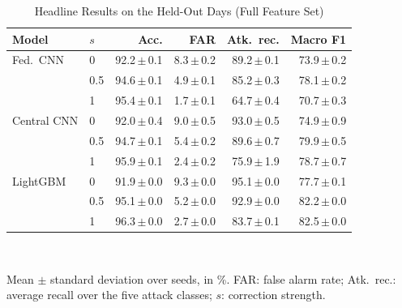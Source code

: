 \begin{table}[t]
\centering
\scriptsize
\caption{Headline Results on the Held-Out Days (Full Feature Set)}
\label{tab:headline}
\setlength{\tabcolsep}{2.5pt}
\begin{tabular}{llrrrr}
\toprule
Model & $s$ & Acc. & FAR & Atk.\ rec. & Macro F1 \\
\midrule
Fed.\ CNN & 0 & 92.2{\,}$\pm${\,}0.1 & 8.3{\,}$\pm${\,}0.2 & 89.2{\,}$\pm${\,}0.1 & 73.9{\,}$\pm${\,}0.2 \\
 & 0.5 & 94.6{\,}$\pm${\,}0.1 & 4.9{\,}$\pm${\,}0.1 & 85.2{\,}$\pm${\,}0.3 & 78.1{\,}$\pm${\,}0.2 \\
 & 1 & 95.4{\,}$\pm${\,}0.1 & 1.7{\,}$\pm${\,}0.1 & 64.7{\,}$\pm${\,}0.4 & 70.7{\,}$\pm${\,}0.3 \\
\midrule
Central CNN & 0 & 92.0{\,}$\pm${\,}0.4 & 9.0{\,}$\pm${\,}0.5 & 93.0{\,}$\pm${\,}0.5 & 74.9{\,}$\pm${\,}0.9 \\
 & 0.5 & 94.7{\,}$\pm${\,}0.1 & 5.4{\,}$\pm${\,}0.2 & 89.6{\,}$\pm${\,}0.7 & 79.9{\,}$\pm${\,}0.5 \\
 & 1 & 95.9{\,}$\pm${\,}0.1 & 2.4{\,}$\pm${\,}0.2 & 75.9{\,}$\pm${\,}1.9 & 78.7{\,}$\pm${\,}0.7 \\
\midrule
LightGBM & 0 & 91.9{\,}$\pm${\,}0.0 & 9.3{\,}$\pm${\,}0.0 & 95.1{\,}$\pm${\,}0.0 & 77.7{\,}$\pm${\,}0.1 \\
 & 0.5 & 95.1{\,}$\pm${\,}0.0 & 5.2{\,}$\pm${\,}0.0 & 92.9{\,}$\pm${\,}0.0 & 82.2{\,}$\pm${\,}0.0 \\
 & 1 & 96.3{\,}$\pm${\,}0.0 & 2.7{\,}$\pm${\,}0.0 & 83.7{\,}$\pm${\,}0.1 & 82.5{\,}$\pm${\,}0.0 \\
\bottomrule
\end{tabular}
\\[2pt]
\parbox{\linewidth}{\scriptsize Mean $\pm$ standard deviation over  seeds, in \%. FAR: false alarm rate; Atk.\ rec.: average recall over the five attack classes; $s$: correction strength.}
\end{table}
